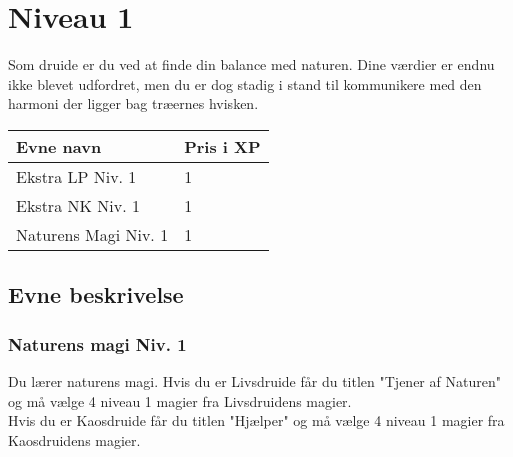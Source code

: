 \chapter*{Niveau 1}
Som druide er du ved at finde din balance med naturen. Dine værdier er endnu ikke blevet udfordret, men du er dog stadig i stand til kommunikere med den harmoni der ligger bag træernes hvisken. 

\begin{table}[H]
    \centering
    \begin{tabular}{|p{}|p{}|}
    \rowcolor{cerulean!80}\hline
        Evne navn & Pris i XP \\\hline
        Ekstra LP Niv. 1 & 1\\\hline
        Ekstra NK Niv. 1& 1\\\hline
        Naturens Magi Niv. 1& 1\\\hline
    \end{tabular}
\end{table}

\section*{Evne beskrivelse}





\subsection*{Naturens magi Niv. 1}
Du lærer naturens magi. Hvis du er Livsdruide får du titlen "Tjener af Naturen" og må vælge 4 niveau 1 magier fra Livsdruidens magier.\\ Hvis du er Kaosdruide får du titlen "Hjælper" og må vælge 4 niveau 1 magier fra Kaosdruidens magier.